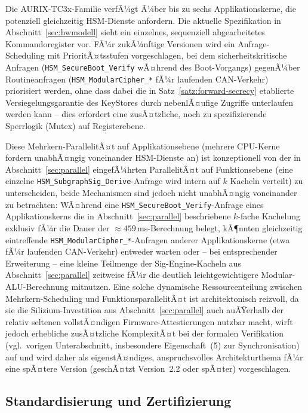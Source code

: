 ﻿\documentclass[a4paper,12pt]{article}
\theoremstyle{definition}
\begin{document}
Die AURIX-TC3x-Familie verfÃ¼gt Ã¼ber bis zu sechs Applikationskerne, die potenziell gleichzeitig HSM-Dienste anfordern. Die aktuelle Spezifikation in Abschnitt~\ref{sec:hwmodell} sieht ein einzelnes, sequenziell abgearbeitetes Kommandoregister vor. FÃ¼r zukÃ¼nftige Versionen wird ein Anfrage-Scheduling mit PrioritÃ¤tsstufen vorgeschlagen, bei dem sicherheitskritische Anfragen (\texttt{HSM\_SecureBoot\_Verify} wÃ¤hrend des Boot-Vorgangs) gegenÃ¼ber Routineanfragen (\texttt{HSM\_ModularCipher\_*} fÃ¼r laufenden CAN-Verkehr) priorisiert werden, ohne dass dabei die in Satz~\ref{satz:forward-secrecy} etablierte Versiegelungsgarantie des KeyStores durch nebenlÃ¤ufige Zugriffe unterlaufen werden kann -- dies erfordert eine zusÃ¤tzliche, noch zu spezifizierende Sperrlogik (Mutex) auf Registerebene.

Diese Mehrkern-ParallelitÃ¤t auf Applikationsebene (mehrere CPU-Kerne fordern unabhÃ¤ngig voneinander HSM-Dienste an) ist konzeptionell von der in Abschnitt~\ref{sec:parallel} eingefÃ¼hrten ParallelitÃ¤t auf Funktionsebene (eine einzelne \texttt{HSM\_SubgraphSig\_Derive}-Anfrage wird intern auf $k$ Kacheln verteilt) zu unterscheiden, beide Mechanismen sind jedoch nicht unabhÃ¤ngig voneinander zu betrachten: WÃ¤hrend eine \texttt{HSM\_SecureBoot\_Verify}-Anfrage eines Applikationskerns die in Abschnitt~\ref{sec:parallel} beschriebene $k$-fache Kachelung exklusiv fÃ¼r die Dauer der $\approx 459$\,ms-Berechnung belegt, kÃ¶nnten gleichzeitig eintreffende \texttt{HSM\_ModularCipher\_*}-Anfragen anderer Applikationskerne (etwa fÃ¼r laufenden CAN-Verkehr) entweder warten oder -- bei entsprechender Erweiterung -- eine kleine Teilmenge der Sig-Engine-Kacheln aus Abschnitt~\ref{sec:parallel} zeitweise fÃ¼r die deutlich leichtgewichtigere Modular-ALU-Berechnung mitnutzen. Eine solche dynamische Ressourcenteilung zwischen Mehrkern-Scheduling und FunktionsparallelitÃ¤t ist architektonisch reizvoll, da sie die Silizium-Investition aus Abschnitt~\ref{sec:parallel} auch auÃŸerhalb der relativ seltenen vollstÃ¤ndigen Firmware-Attestierungen nutzbar macht, wirft jedoch erhebliche zusÃ¤tzliche KomplexitÃ¤t bei der formalen Verifikation (vgl.\ vorigen Unterabschnitt, insbesondere Eigenschaft~(5) zur Synchronisation) auf und wird daher als eigenstÃ¤ndiges, anspruchsvolles Architekturthema fÃ¼r eine spÃ¤tere Version (geschÃ¤tzt Version~2.2 oder spÃ¤ter) vorgeschlagen.

\subsection{Standardisierung und Zertifizierung}
\end{document}
